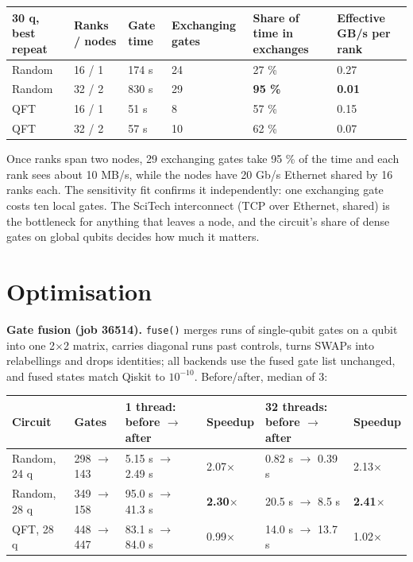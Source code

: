 \documentclass[10pt,a4paper]{article}
\begin{document}
\begin{table}[ht]\centering\small
\begin{tabularx}{\linewidth}{@{}XllllX@{}}
\toprule
\textbf{30 q, best repeat} & \textbf{Ranks / nodes} & \textbf{Gate time} & \textbf{Exchanging gates} & \textbf{Share of time in exchanges} & \textbf{Effective GB/s per rank} \\
\midrule
Random & 16 / 1 & 174 s & 24 & 27 \% & 0.27 \\
Random & 32 / 2 & 830 s & 29 & \textbf{95 \%} & \textbf{0.01} \\
QFT & 16 / 1 & 51 s & 8 & 57 \% & 0.15 \\
QFT & 32 / 2 & 57 s & 10 & 62 \% & 0.07 \\
\bottomrule
\end{tabularx}
\end{table}



Once ranks span two nodes, 29 exchanging gates take 95 \% of the time and each rank sees about 10 MB/s, while the nodes have 20 Gb/s Ethernet shared by 16 ranks each. The sensitivity fit confirms it independently: one exchanging gate costs ten local gates. The SciTech interconnect (TCP over Ethernet, shared) is the bottleneck for anything that leaves a node, and the circuit's share of dense gates on global qubits decides how much it matters.



\section{Optimisation}



\textbf{Gate fusion (job 36514).} \texttt{fuse()} merges runs of single-qubit gates on a qubit into one 2$\times$2 matrix, carries diagonal runs past controls, turns SWAPs into relabellings and drops identities; all backends use the fused gate list unchanged, and fused states match Qiskit to $10^{-10}$. Before/after, median of 3:



\begin{table}[ht]\centering\small
\begin{tabularx}{\linewidth}{@{}XllllX@{}}
\toprule
\textbf{Circuit} & \textbf{Gates} & \textbf{1 thread: before $\rightarrow$ after} & \textbf{Speedup} & \textbf{32 threads: before $\rightarrow$ after} & \textbf{Speedup} \\
\midrule
Random, 24 q & 298 $\rightarrow$ 143 & 5.15 s $\rightarrow$ 2.49 s & 2.07$\times$ & 0.82 s $\rightarrow$ 0.39 s & 2.13$\times$ \\
Random, 28 q & 349 $\rightarrow$ 158 & 95.0 s $\rightarrow$ 41.3 s & \textbf{2.30$\times$} & 20.5 s $\rightarrow$ 8.5 s & \textbf{2.41$\times$} \\
QFT, 28 q & 448 $\rightarrow$ 447 & 83.1 s $\rightarrow$ 84.0 s & 0.99$\times$ & 14.0 s $\rightarrow$ 13.7 s & 1.02$\times$ \\
\bottomrule
\end{tabularx}
\end{table}
\end{document}
